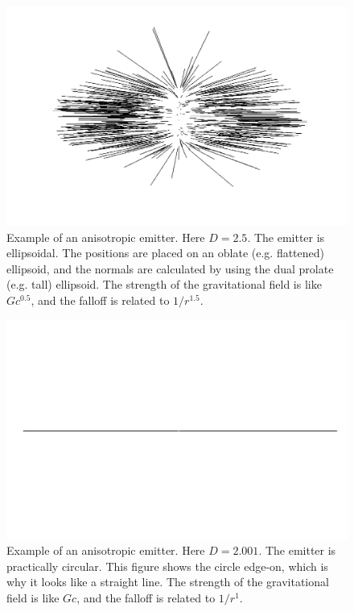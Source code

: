 \documentclass[12pt]{article}
\begin{document}
\begin{figure} 
\centering
  \includegraphics[width = 5 in]{2.5.png}
  \caption{
Example of an anisotropic emitter.
Here $D = 2.5$. 
The emitter is ellipsoidal.
The positions are placed on an oblate (e.g. flattened) ellipsoid, and the normals are calculated by using the dual prolate (e.g. tall) ellipsoid.
The strength of the gravitational field is like $G c^{0.5}$, and the falloff is related to $1/r^{1.5}$.
}
\end{figure}


\begin{figure} 
\centering
  \includegraphics[width = 5 in]{2.png}
  \caption{
Example of an anisotropic emitter.
Here $D = 2.001$. 
The emitter is practically circular. 
This figure shows the circle edge-on, which is why it looks like a straight line.
The strength of the gravitational field is like $Gc$, and the falloff is related to $1/r^1$.
}
\end{figure}
\end{document}
